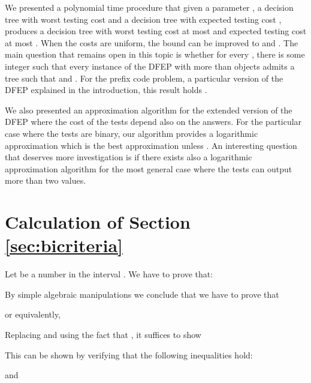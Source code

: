 \documentclass{llncs}
\begin{document}
We presented a polynomial time procedure that given a parameter , a decision tree 
 with worst testing cost  and a decision tree  with expected testing cost , produces
a decision tree  with worst testing cost at most  and expected
testing cost at most . When the costs are uniform,
the bound can be improved to  and . 
The main question that remains open in this topic is whether for 
every , there is some integer  such that
every instance  of the DFEP with more than
 objects admits a tree  such that  and 
.
For the prefix code problem, a particular version of the DFEP explained  in the introduction, this result
holds \cite{laber}.



We also presented an approximation algorithm for the 
extended version of the DFEP where the 
cost of the tests  depend also on the answers.
For the particular case where the tests are binary, our algorithm provides a logarithmic approximation which is the best
approximation unless .
An interesting question that deserves more investigation is if there exists also a logarithmic approximation algorithm for the most general 
case where the  tests can output more than two values.






\appendix

\section{Calculation of Section \ref{sec:bicriteria}}

Let  be a number in the interval . We have to prove that:



By simple algebraic manipulations we conclude that we have to prove that



or equivalently,

 

Replacing  and using the fact that , it suffices to show

 



 

 


 


 
  


This can be shown by verifying that the following inequalities hold:




and
\end{document}
